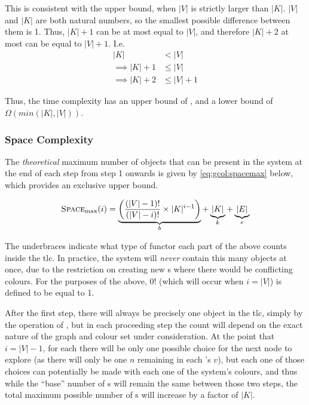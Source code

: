 This is consistent with the upper bound, when \(|V|\) is strictly larger than \(|K|\).  \(|V|\) and \(|K|\) are both natural numbers, so the smallest possible difference between them is 1.  Thus, \(|K| + 1\) can be at most equal to \(|V|\), and therefore \(|K| + 2\) at most can be equal to \(|V| + 1\).  I.e.
\begin{align*}
    |K| &< |V|\\
    \implies |K| + 1 &\leq |V|\\
    \implies |K| + 2 &\leq |V| + 1
\end{align*}

Thus, the time complexity has an upper bound of , and a lower bound of \(\Omega(min(|K|, |V|))\).

\subsubsection{Space Complexity}

The \emph{theoretical} maximum number of objects that can be present in the system at the end of each step from step 1 onwards is given by \cref{eq:gcol:spacemax} below, which provides an exclusive upper bound.

\begin{equation}\label{eq:gcol:spacemax}
    \textsc{Space}_{\text{max}}(i) = \underbrace{\bigg(\frac{(|V| - 1)!}{(|V| - i)!} \times |K|^{i-1}\bigg)}_{b} + \underbrace{|K|}_{k} + \underbrace{|E|}_{e}
\end{equation}

The underbraces indicate what type of functor each part of the above counts inside the \gls{tlc}.  In practice, the system will \emph{never} contain this many objects at once, due to the restriction on creating new \bo{}s where there would be conflicting colours.  For the purposes of the above, \(0!\) (which will occur when \(i = |V|\)) is defined to be equal to 1.

After the first step, there will always be precisely one \bo{} object in the \gls{tlc}, simply by the operation of , but in each proceeding step the count will depend on the exact nature of the graph and colour set under consideration.  At the point that \(i = |V| - 1\), for each \bo{} there will be only one possible choice for the next node to explore (as there will only be one \(n\) remaining in each \bo{}'s \(v\)), but each one of those choices can potentially be made with each one of the system's colours, and thus while the ``base'' number of \bo{}s will remain the same between those two steps, the total maximum possible number of \bo{}s will increase by a factor of \(|K|\).

